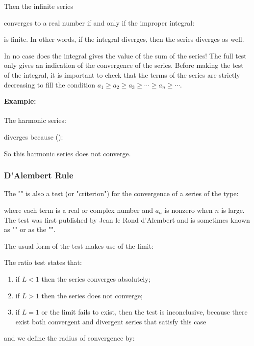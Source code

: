 	Then the infinite series
	
	converges to a real number if and only if the improper integral:
	
	is finite. In other words, if the integral diverges, then the series diverges as well.
	\begin{tcolorbox}[title=Remark,colframe=black,arc=10pt]
	In no case does the integral gives the value of the sum of the series! The full test only gives an indication of the convergence of the series. Before making the test of the integral, it is important to check that the terms of the series are strictly decreasing to fill the condition $a_1\ge a_2\ge a_3\ge \cdots\ge a_n\ge \cdots$.
	\end{tcolorbox}
	\begin{tcolorbox}[colframe=black,colback=white,sharp corners]
	\textbf{{\Large {}}Example:}\\\\
	The harmonic series:
	
	diverges because ():
	
	So this harmonic series does not converge.
	\end{tcolorbox}
	
	\subsubsection{D'Alembert Rule}
	The "" is also a test (or "criterion") for the convergence of a series of the type:
	
	where each term is a real or complex number and $a_n$ is nonzero when $n$ is large. The test was first published by Jean le Rond d'Alembert and is sometimes known as "" or as the "".
	
	The usual form of the test makes use of the limit:
	
 	The ratio test states that:
	\begin{enumerate}
		\item if $L < 1$ then the series converges absolutely;
		\item if $L > 1$ then the series does not converge;
		\item if $L = 1$ or the limit fails to exist, then the test is inconclusive, because there exist both convergent and divergent series that satisfy this case
	\end{enumerate}
	and we define the radius of convergence by:
	
